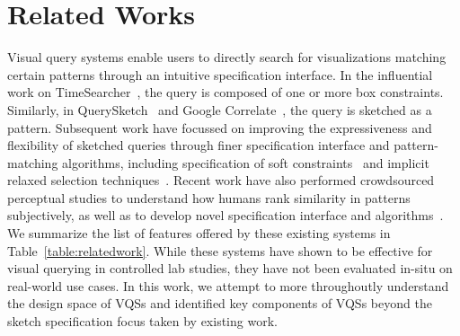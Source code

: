 \section{Related Works \label{sec:relatedworks}}
Visual query systems enable users to directly search for visualizations matching certain patterns through an intuitive specification interface. In the influential work on TimeSearcher~\cite{Hochheiser2001,Hochheiser2004}, the query is composed of one or more box constraints. Similarly, in QuerySketch~\cite{wattenberg2001sketching} and Google Correlate~\cite{mohebbi2011google}, the query is sketched as a pattern. Subsequent work have focussed on improving the expressiveness and flexibility of sketched queries through finer specification interface and pattern-matching algorithms, including specification of soft constraints~\cite{ryall2005querylines} and implicit relaxed selection techniques~\cite{Holz2009}. Recent work have also performed crowdsourced perceptual studies to understand how humans rank similarity in patterns subjectively, as well as to develop novel specification interface and algorithms~\cite{Eichmann2015,correll2016semantics,Mannino2018}. We summarize the list of features offered by these existing systems in Table~\ref{table:relatedwork}. While these systems have shown to be effective for visual querying in controlled lab studies, they have not been evaluated in-situ on real-world use cases. In this work, we attempt to more throughoutly understand the design space of VQSs and identified key components of VQSs beyond the sketch specification focus taken by existing work.




